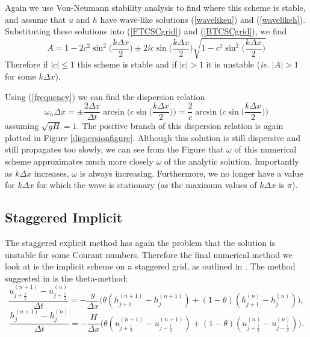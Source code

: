 \documentclass[a4paper, 10.5pt, notitlepage]{article}
\begin{document}
Again we use Von-Neumann stability analysis to find where this scheme is stable, and assume that $u$ and $h$ have wave-like solutions (\ref{wavelikeu}) and (\ref{wavelikeh}). Substituting these solutions into (\ref{FTCSCgrid}) and (\ref{BTCSCgrid}), we find
\begin{equation}
A = 1 - 2c^{2}\sin^{2}\bigg(\frac{k\Delta x}{2}\bigg) \pm 2ic\sin\bigg(\frac{k\Delta x}{2}\bigg) \sqrt{1 - c^{2}\sin^{2}\bigg(\frac{k\Delta x}{2}\bigg)}
\end{equation}
Therefore if $\lvert c \rvert \leq 1$ this scheme is stable and if $\lvert c \rvert > 1$ it is unstable  (\textit{ie.} $\vert A \rvert > 1$ for some $k\Delta x$).

Using (\ref{frequency}) we can find the dispersion relation
\begin{equation}
	\omega_{n} \Delta x = \pm\frac{2\Delta x}{\Delta t} \arcsin\bigg(c\sin\bigg(\frac{k\Delta x}{2}\bigg)\bigg) = \frac{2}{c} \arcsin\bigg(c\sin\bigg(\frac{k\Delta x}{2}\bigg)\bigg) 
\end{equation}
assuming $\sqrt{gH} = 1$. The positive branch of this dispersion relation is again plotted in Figure \ref{dispersionfigure}. Although this solution is still dispersive and still propagates too slowly, we can see from the Figure that $\omega$ of this numerical scheme approximates much more closely $\omega$ of the analytic solution. Importantly as $k\Delta x$ increases, $\omega$ is always increasing. Furthermore, we no longer have a value for $k\Delta x$ for which the wave is stationary (as the maximum values of $k\Delta x$ is $\pi$).

\subsection{Staggered Implicit}
The staggered explicit method has again the problem that the solution is unstable for some Courant numbers. Therefore the final numerical method we look at is the implicit scheme on a staggered grid, as outlined in \cite{implicit}. The method suggested in \cite{implicit} is the theta-method:
\begin{equation}
\frac{u_{j + \frac{1}{2}}^{(n + 1)} - u_{j + \frac{1}{2}}^{(n)}}{\Delta t} = -\frac{g}{\Delta x} \bigg(\theta (h_{j + 1}^{(n+ 1)} - h_{j}^{(n+ 1)}) + (1 - \theta) (h_{j + 1}^{(n)} - h_{j}^{(n)})\bigg),
\end{equation}
\begin{equation}
\frac{h_{j}^{(n + 1)} - h_{j}^{(n)}}{\Delta t} = -\frac{H}{\Delta x} \bigg(\theta (u_{j + \frac{1}{2}}^{(n+ 1)} - u_{j - \frac{1}{2}}^{(n+ 1)}) + (1 - \theta) (u_{j + \frac{1}{2}}^{(n)} - u_{j - \frac{1}{2}}^{(n)})\bigg).
\end{equation}
\end{document}
